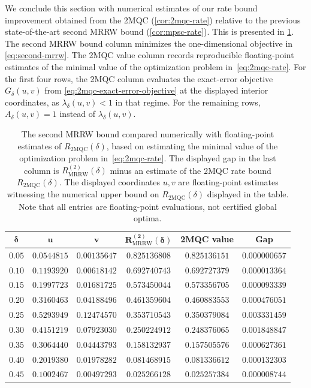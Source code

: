 \documentclass[11pt]{article}
\renewcommand{\arraystretch}{1.25}
\theoremstyle{remark}
\newcommand{\MRRW}{R_{\mathrm{MRRW}}}
\newcommand{\mMQC}{2\mathrm{MQC}}
\begin{document}
We conclude this section with numerical estimates of our rate bound improvement obtained from the 2MQC (\cref{cor:2mqc-rate}) relative to the previous state-of-the-art second MRRW bound (\cref{cor:mpsc-rate}). This is presented in \cref{tab:2mqc-mrrw-numerics}. The second MRRW bound column minimizes the one-dimensional objective in \eqref{eq:second-mrrw}. The 2MQC value column records reproducible floating-point estimates of the minimal value of the optimization problem in~\cref{eq:2mqc-rate}. For the first four rows, the 2MQC column evaluates the exact-error objective $G_\delta(u,v)$ from \eqref{eq:2mqc-exact-error-objective} at the displayed interior coordinates, as $\lambda_\delta(u,v) < 1$ in that regime. For the remaining rows, $A_\delta(u,v) = 1$ instead of $\lambda_\delta(u,v)$.

\begin{table}[!htbp]
\centering
\caption{The second MRRW bound compared numerically with floating-point estimates of $R_{\mMQC}(\delta)$, based on estimating the minimal value of the optimization problem in~\cref{eq:2mqc-rate}. The displayed gap in the last column is $\MRRW^{(2)}(\delta)$ minus an estimate of the 2MQC rate bound $R_{\mMQC}(\delta)$. The displayed coordinates $u,v$ are floating-point estimates witnessing the numerical upper bound on $R_{\mMQC}(\delta)$ displayed in the table. Note that all entries are floating-point evaluations, not certified global optima.}
\label{tab:2mqc-mrrw-numerics}
\footnotesize
\renewcommand{\arraystretch}{1.4}
\begin{tabular}{@{}cccccc@{}}
\toprule
$\boldsymbol{\delta}$
& $\boldsymbol{u}$
& $\boldsymbol{v}$
& $\boldsymbol{\MRRW^{(2)}(\delta)}$
& \textbf{2MQC value}
& \textbf{Gap} \\
\midrule
$0.05$ & $0.0544815$ & $0.00135647$ & $0.825136808$ & $0.825136151$ & $0.000000657$ \\
$0.10$ & $0.1193920$ & $0.00618142$ & $0.692740743$ & $0.692727379$ & $0.000013364$ \\
$0.15$ & $0.1997723$ & $0.01681725$ & $0.573450044$ & $0.573356705$ & $0.000093339$ \\
$0.20$ & $0.3160463$ & $0.04188496$ & $0.461359604$ & $0.460883553$ & $0.000476051$ \\
$0.25$ & $0.5293949$ & $0.12474570$ & $0.353710543$ & $0.350379084$ & $0.003331459$ \\
$0.30$ & $0.4151219$ & $0.07923030$ & $0.250224912$ & $0.248376065$ & $0.001848847$ \\
$0.35$ & $0.3064440$ & $0.04443793$ & $0.158132937$ & $0.157505576$ & $0.000627361$ \\
$0.40$ & $0.2019380$ & $0.01978282$ & $0.081468915$ & $0.081336612$ & $0.000132303$ \\
$0.45$ & $0.1002467$ & $0.00497293$ & $0.025266128$ & $0.025257384$ & $0.000008744$ \\
\bottomrule
\end{tabular}
\end{table}
\FloatBarrier
\end{document}
